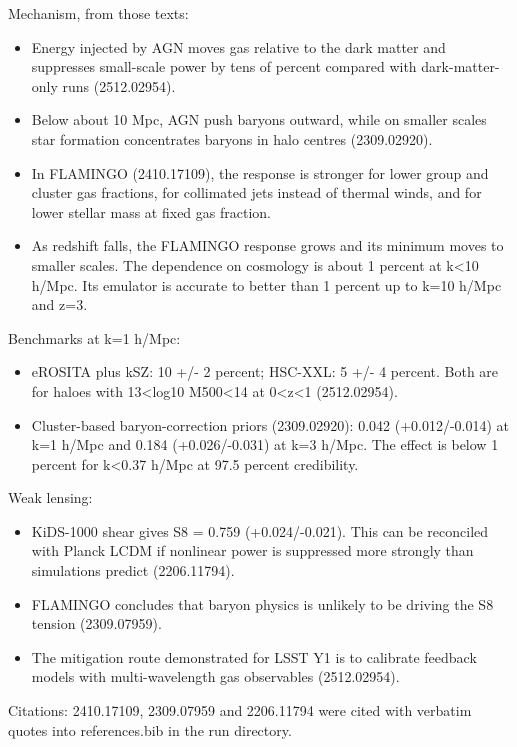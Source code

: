 \documentclass[11pt,a4paper]{article}
\begin{document}
Mechanism, from those texts:

\begin{itemize}
  \item Energy injected by AGN moves gas relative to the dark matter and suppresses small-scale power by tens of percent compared with dark-matter-only runs (2512.02954).
  \item Below about 10 Mpc, AGN push baryons outward, while on smaller scales star formation concentrates baryons in halo centres (2309.02920).
  \item In FLAMINGO (2410.17109), the response is stronger for lower group and cluster gas fractions, for collimated jets instead of thermal winds, and for lower stellar mass at fixed gas fraction.
  \item As redshift falls, the FLAMINGO response grows and its minimum moves to smaller scales. The dependence on cosmology is about 1 percent at k\textless{}10 h/Mpc. Its emulator is accurate to better than 1 percent up to k=10 h/Mpc and z=3.
\end{itemize}
Benchmarks at k=1 h/Mpc:

\begin{itemize}
  \item eROSITA plus kSZ: 10 +/- 2 percent; HSC-XXL: 5 +/- 4 percent. Both are for haloes with 13\textless{}log10 M500\textless{}14 at 0\textless{}z\textless{}1 (2512.02954).
  \item Cluster-based baryon-correction priors (2309.02920): 0.042 (+0.012/-0.014) at k=1 h/Mpc and 0.184 (+0.026/-0.031) at k=3 h/Mpc. The effect is below 1 percent for k\textless{}0.37 h/Mpc at 97.5 percent credibility.
\end{itemize}
Weak lensing:

\begin{itemize}
  \item KiDS-1000 shear gives S8 = 0.759 (+0.024/-0.021). This can be reconciled with Planck LCDM if nonlinear power is suppressed more strongly than simulations predict (2206.11794).
  \item FLAMINGO concludes that baryon physics is unlikely to be driving the S8 tension (2309.07959).
  \item The mitigation route demonstrated for LSST Y1 is to calibrate feedback models with multi-wavelength gas observables (2512.02954).
\end{itemize}
Citations: 2410.17109, 2309.07959 and 2206.11794 were cited with verbatim quotes into references.bib in the run directory.
\end{document}
